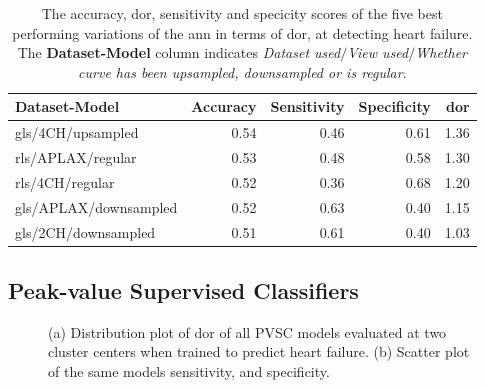 \begin{table}
    \centering
    \begin{tabular}{lrrrr}
        \toprule
        Dataset-Model         &  Accuracy &  Sensitivity &  Specificity &  \acrshort{dor} \\
        \midrule
        gls/4CH/upsampled     &      0.54 &         0.46 &         0.61 & 1.36 \\
        rls/APLAX/regular     &      0.53 &         0.48 &         0.58 & 1.30 \\
        rls/4CH/regular       &      0.52 &         0.36 &         0.68 & 1.20 \\
        gls/APLAX/downsampled &      0.52 &         0.63 &         0.40 & 1.15 \\
        gls/2CH/downsampled   &      0.51 &         0.61 &         0.40 & 1.03 \\
        \bottomrule
    \end{tabular}
    \caption{The accuracy, \acrshort{dor}, sensitivity and specicity scores of the five best performing variations of the \acrshort{ann} in terms of \acrshort{dor}, at detecting heart failure.
             The \textbf{Dataset-Model} column indicates \textit{Dataset used}$/$\textit{View used}$/$\textit{Whether curve has been upsampled, downsampled or is regular}.}
    \label{tab:dl_hf_dor_sens_spec_dist}
\end{table}
\newpage

\subsection{Peak-value Supervised Classifiers}

\begin{figure}[htb]
    \centering
    
    \caption{(a) Distribution plot of \acrshort{dor} of all PVSC models evaluated at two cluster centers when trained to predict heart failure.
             (b) Scatter plot of the same models sensitivity, and specificity.}
    \label{fig:pvmlc_hf_dor_sens_spec_dis}
\end{figure}

